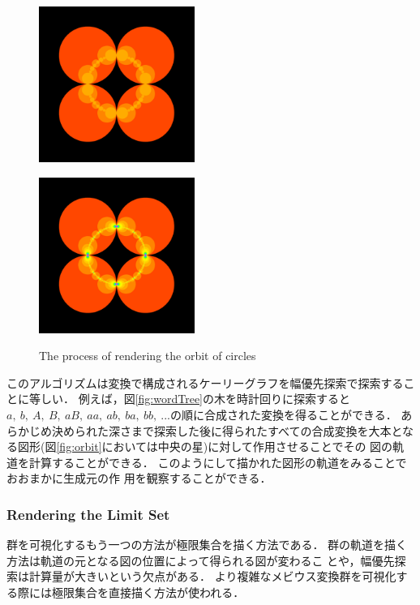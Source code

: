 \begin{figure}[htbp]
\begin{minipage}{0.33\hsize}
  \subcaption{}
  \label{fig:level1inv}
 \end{minipage}
 \begin{minipage}{0.33\hsize}
  \center
  \includegraphics[width=2in, height=2in, keepaspectratio]{../img/klein/orbit/level2.pdf}
  \subcaption{}
  \label{fig:level2}
 \end{minipage}
 \begin{minipage}{0.33\hsize}
  \center
  \includegraphics[width=2in, height=2in, keepaspectratio]{../img/klein/orbit/levelMax.pdf}
  \subcaption{}
  \label{fig:levelMax}
 \end{minipage}
 \caption{The process of rendering the orbit of circles}
\end{figure}

このアルゴリズムは変換で構成されるケーリーグラフを幅優先探索で探索するこ
とに等しい．
例えば，図\ref{fig:wordTree}の木を時計回りに探索すると$a,~b,~A,~B,~
aB,~aa,~ab,~ba,~bb,~...$の順に合成された変換を得ることができる．
あらかじめ決められた深さまで探索した後に得られたすべての合成変換を大本とな
る図形(図\ref{fig:orbit}においては中央の星)に対して作用させることでその
図の軌道を計算することができる．
このようにして描かれた図形の軌道をみることでおおまかに生成元の作
用を観察することができる．

\subsubsection{Rendering the Limit Set}

群を可視化するもう一つの方法が極限集合を描く方法である．
群の軌道を描く方法は軌道の元となる図の位置によって得られる図が変わるこ
とや，幅優先探索は計算量が大きいという欠点がある．
より複雑なメビウス変換群を可視化する際には極限集合を直接描く方法が使われる．

